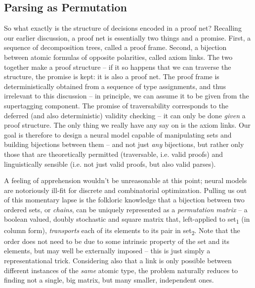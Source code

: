 \subsection{Parsing as Permutation}
So what exactly is the structure of decisions encoded in a proof net?
Recalling our earlier discussion, a proof net is essentially two things and a promise.
First, a sequence of decomposition trees, called a proof frame.
Second, a bijection between atomic formulas of opposite polarities, called axiom links.
The two together make a proof structure -- if it so happens that we can traverse the structure, the promise is kept: it is also a proof net.
The proof frame is deterministically obtained from a sequence of type assignments, and thus irrelevant to this discussion -- in principle, we can assume it to be given from the supertagging component.
The promise of traversability corresponds to the deferred (and also deterministic) validity checking -- it can only be done \textit{given} a proof structure.
The only thing we really have any say on is the axiom links.
Our goal is therefore to design a neural model capable of manipulating sets and building bijections between them -- and not just \textit{any} bijections, but rather only those that are theoretically permitted (traversable, i.e. valid proofs) and linguistically sensible (i.e. not just valid proofs, but also valid parses).

A feeling of apprehension wouldn't be unreasonable at this point; neural models are notoriously ill-fit for discrete and combinatorial optimization.
Pulling us out of this momentary lapse is the folkloric knowledge that a bijection between two ordered sets, or \textit{chains}, can be uniquely represented as a \textit{permutation matrix} -- a boolean valued, doubly stochastic and square matrix that, left-applied to set\textsubscript{1} (in column form), \textit{transports} each of its elements to its pair in set\textsubscript{2}.
Note that the order does not need to be due to some intrinsic property of the set and its elements, but may well be externally imposed -- this is just simply a representational trick.
Considering also that a link is only possible between different instances of the \textit{same} atomic type, the problem naturally reduces to finding not a single, big matrix, but many smaller, independent ones.

